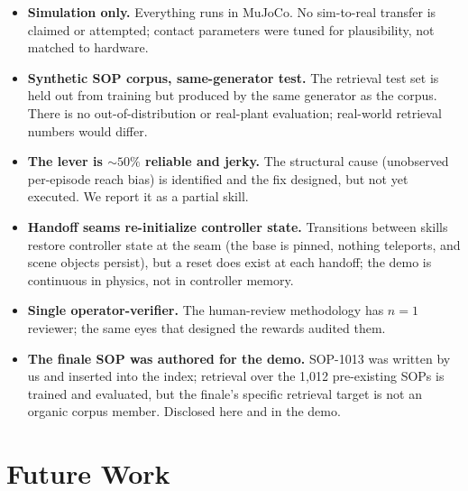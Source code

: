 \documentclass[11pt]{article}
\begin{document}
\begin{itemize}[nosep]
  \item \textbf{Simulation only.} Everything runs in MuJoCo. No sim-to-real transfer is claimed or attempted; contact parameters were tuned for plausibility, not matched to hardware.
  \item \textbf{Synthetic SOP corpus, same-generator test.} The retrieval test set is held out from training but produced by the same generator as the corpus. There is no out-of-distribution or real-plant evaluation; real-world retrieval numbers would differ.
  \item \textbf{The lever is ${\sim}50\%$ reliable and jerky.} The structural cause (unobserved per-episode reach bias) is identified and the fix designed, but not yet executed. We report it as a partial skill.
  \item \textbf{Handoff seams re-initialize controller state.} Transitions between skills restore controller state at the seam (the base is pinned, nothing teleports, and scene objects persist), but a reset does exist at each handoff; the demo is continuous in physics, not in controller memory.
  \item \textbf{Single operator-verifier.} The human-review methodology has $n{=}1$ reviewer; the same eyes that designed the rewards audited them.
  \item \textbf{The finale SOP was authored for the demo.} SOP-1013 was written by us and inserted into the index; retrieval over the 1{,}012 pre-existing SOPs is trained and evaluated, but the finale's specific retrieval target is not an organic corpus member. Disclosed here and in the demo.
\end{itemize}

\section{Future Work}
\end{document}
